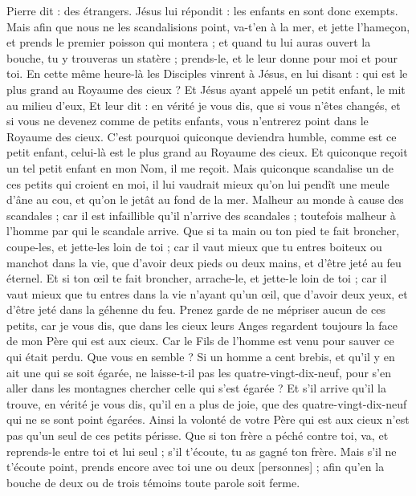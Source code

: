 \begin{multicols}{2}
Pierre dit : des étrangers. Jésus lui répondit : les enfants en sont donc exempts.
Mais afin que nous ne les scandalisions point, va-t'en à la mer, et jette l'hameçon, et prends le premier poisson qui montera ; et quand tu lui auras ouvert la bouche, tu y trouveras un statère ; prends-le, et le leur donne pour moi et pour toi.
\VerseOne{}En cette même heure-là les Disciples vinrent à Jésus, en lui disant : qui est le plus grand au Royaume des cieux ?
Et Jésus ayant appelé un petit enfant, le mit au milieu d'eux,
Et leur dit : en vérité je vous dis, que si vous n'êtes changés, et si vous ne devenez comme de petits enfants, vous n'entrerez point dans le Royaume des cieux.
C'est pourquoi quiconque deviendra humble, comme est ce petit enfant, celui-là est le plus grand au Royaume des cieux.
Et quiconque reçoit un tel petit enfant en mon Nom, il me reçoit.
Mais quiconque scandalise un de ces petits qui croient en moi, il lui vaudrait mieux qu'on lui pendît une meule d'âne au cou, et qu'on le jetât au fond de la mer.
Malheur au monde à cause des scandales ; car il est infaillible qu'il n'arrive des scandales ; toutefois malheur à l'homme par qui le scandale arrive.
Que si ta main ou ton pied te fait broncher, coupe-les, et jette-les loin de toi ; car il vaut mieux que tu entres boiteux ou manchot dans la vie, que d'avoir deux pieds ou deux mains, et d'être jeté au feu éternel.
Et si ton œil te fait broncher, arrache-le, et jette-le loin de toi ; car il vaut mieux que tu entres dans la vie n'ayant qu'un œil, que d'avoir deux yeux, et d'être jeté dans la géhenne du feu.
Prenez garde de ne mépriser aucun de ces petits, car je vous dis, que dans les cieux leurs Anges regardent toujours la face de mon Père qui est aux cieux.
Car le Fils de l'homme est venu pour sauver ce qui était perdu.
Que vous en semble ? Si un homme a cent brebis, et qu'il y en ait une qui se soit égarée, ne laisse-t-il pas les quatre-vingt-dix-neuf, pour s'en aller dans les montagnes chercher celle qui s'est égarée ?
Et s'il arrive qu'il la trouve, en vérité je vous dis, qu'il en a plus de joie, que des quatre-vingt-dix-neuf qui ne se sont point égarées.
Ainsi la volonté de votre Père qui est aux cieux n'est pas qu'un seul de ces petits périsse.
Que si ton frère a péché contre toi, va, et reprends-le entre toi et lui seul ; s'il t'écoute, tu as gagné ton frère.
Mais s'il ne t'écoute point, prends encore avec toi une ou deux [personnes] ; afin qu'en la bouche de deux ou de trois témoins toute parole soit ferme.

\end{multicols}

